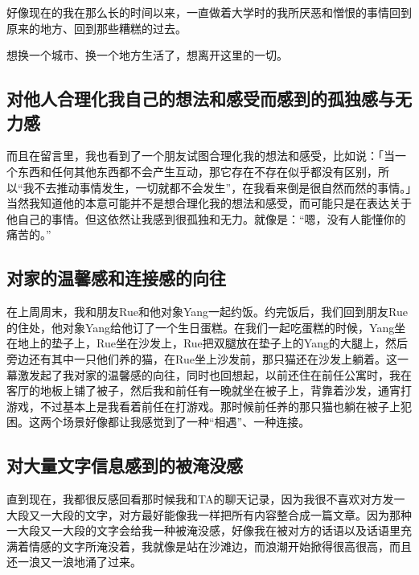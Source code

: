好像现在的我在那么长的时间以来，一直做着大学时的我所厌恶和憎恨的事情\pozhehao{}回到原来的地方、回到那些糟糕的过去。

想换一个城市、换一个地方生活了，想离开这里的一切。







\subsection*{对他人合理化我自己的想法和感受而感到的孤独感与无力感}

而且在留言里，我也看到了一个朋友试图合理化我的想法和感受，比如说：「当一个东西和任何其他东西都不会产生互动，那它存在不存在似乎都没有区别，所以“我不去推动事情发生，一切就都不会发生”，在我看来倒是很自然而然的事情。」当然我知道他的本意可能并不是想合理化我的想法和感受，而可能只是在表达关于他自己的事情。但这依然让我感到很孤独和无力。就像是：“嗯，没有人能懂你的痛苦的。”







\subsection*{对家的温馨感和连接感的向往}

在上周周末，我和朋友Rue和他对象Yang一起约饭。约完饭后，我们回到朋友Rue的住处，他对象Yang给他订了一个生日蛋糕。在我们一起吃蛋糕的时候，Yang坐在地上的垫子上，Rue坐在沙发上，Rue把双腿放在垫子上的Yang的大腿上，然后旁边还有其中一只他们养的猫，在Rue坐上沙发前，那只猫还在沙发上躺着。这一幕激发起了我对家的温馨感的向往，同时也回想起，以前还住在前任公寓时，我在客厅的地板上铺了被子，然后我和前任有一晚就坐在被子上，背靠着沙发，通宵打游戏，不过基本上是我看着前任在打游戏。那时候前任养的那只猫也躺在被子上犯困。这两个场景好像都让我感觉到了一种“相遇”、一种连接。







\subsection*{对大量文字信息感到的被淹没感}

直到现在，我都很反感回看那时候我和TA的聊天记录，因为我很不喜欢对方发一大段又一大段的文字，对方最好能像我一样把所有内容整合成一篇文章。因为那种一大段又一大段的文字会给我一种被淹没感，好像我在被对方的话语以及话语里充满着情感的文字所淹没着，我就像是站在沙滩边，而浪潮开始掀得很高很高，而且还一浪又一浪地涌了过来。


